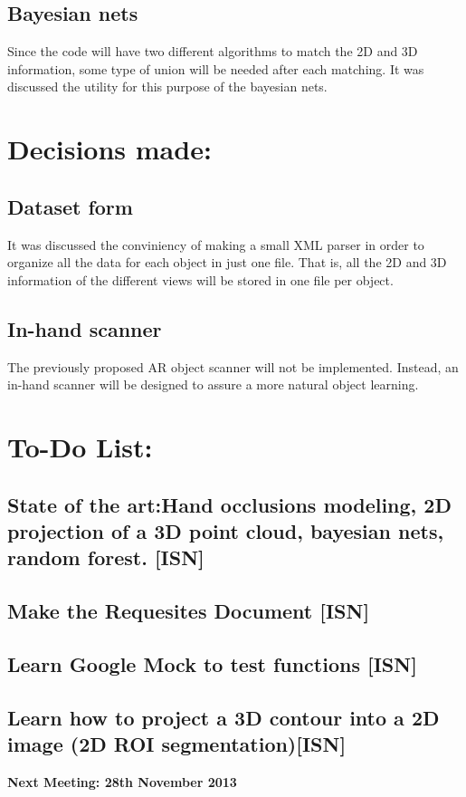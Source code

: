 \documentclass{article}
\newenvironment{myindentpar}[1]%
 {\begin{list}{}%
         {\setlength{\leftmargin}{#1}}%
         \item[]%
 }
 {\end{list}}
\begin{document}
	\subsection{Bayesian nets}
		\begin{myindentpar}{1cm} 
		Since the code will have two different algorithms to match the 2D and 3D information, some type of union will be needed after each matching. It was discussed the utility for this purpose of the bayesian nets. 
		\end{myindentpar}


\section{\LARGE Decisions made:}
	\subsection{Dataset form}
		\begin{myindentpar}{1cm} 
		It was discussed the conviniency of making a small XML parser in order to organize all the data for each object in just one file. That is, all the 2D and 3D information of the different views will be stored in one file per object. 
		\end{myindentpar}

	\subsection{In-hand scanner}
		\begin{myindentpar}{1cm} 
		The previously proposed AR object scanner will not be implemented. Instead, an in-hand scanner will be designed to assure a more natural object learning. 
		\end{myindentpar}

\section{\LARGE To-Do List: }
	\subsection{State of the art:Hand occlusions modeling, 2D projection of a 3D point cloud, bayesian nets, random forest. [ISN]}
		\begin{myindentpar}{1cm} 
		 
		\end{myindentpar}
		
	\subsection{Make the Requesites Document [ISN]}
		\begin{myindentpar}{1cm} 
		
		\end{myindentpar}

	\subsection{Learn Google Mock to test functions [ISN]}
	\subsection{Learn how to project a 3D contour into a 2D image (2D ROI segmentation)[ISN]}
\begin {center}
{\Large \textbf{Next Meeting: 28th November 2013}}
\end{center}
\end{document}
